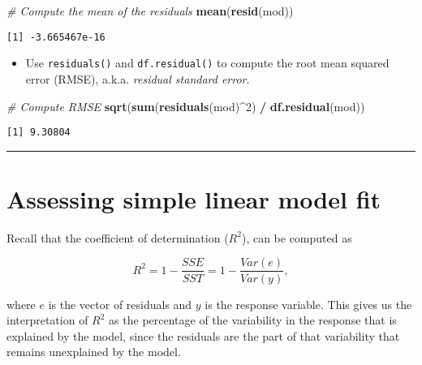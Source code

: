 \documentclass[
]{book}
\newenvironment{Shaded}{\begin{snugshade}}{\end{snugshade}}
\newcommand{\CommentTok}[1]{\textcolor[rgb]{0.56,0.35,0.01}{\textit{#1}}}
\newcommand{\DecValTok}[1]{\textcolor[rgb]{0.00,0.00,0.81}{#1}}
\newcommand{\KeywordTok}[1]{\textcolor[rgb]{0.13,0.29,0.53}{\textbf{#1}}}
\newcommand{\NormalTok}[1]{#1}
\newcommand{\OperatorTok}[1]{\textcolor[rgb]{0.81,0.36,0.00}{\textbf{#1}}}
\newcommand{\StringTok}[1]{\textcolor[rgb]{0.31,0.60,0.02}{#1}}
\providecommand{\tightlist}{%
  \setlength{\itemsep}{0pt}\setlength{\parskip}{0pt}}
\begin{document}
\begin{Shaded}
\begin{Highlighting}[]
\CommentTok{# Compute the mean of the residuals}
\KeywordTok{mean}\NormalTok{(}\KeywordTok{resid}\NormalTok{(mod))}
\end{Highlighting}
\end{Shaded}

\begin{verbatim}
[1] -3.665467e-16
\end{verbatim}

\begin{itemize}
\tightlist
\item
  Use \texttt{residuals()} and \texttt{df.residual()} to compute the root mean squared error (RMSE), a.k.a. \emph{residual standard error}.
\end{itemize}

\begin{Shaded}
\begin{Highlighting}[]
\CommentTok{# Compute RMSE}
\KeywordTok{sqrt}\NormalTok{(}\KeywordTok{sum}\NormalTok{(}\KeywordTok{residuals}\NormalTok{(mod)}\OperatorTok{^}\DecValTok{2}\NormalTok{) }\OperatorTok{/}\StringTok{ }\KeywordTok{df.residual}\NormalTok{(mod))}
\end{Highlighting}
\end{Shaded}

\begin{verbatim}
[1] 9.30804
\end{verbatim}

\begin{center}\rule{0.5\linewidth}{0.5pt}\end{center}

\hypertarget{assessing-simple-linear-model-fit}{%
\section{Assessing simple linear model fit}\label{assessing-simple-linear-model-fit}}

Recall that the coefficient of determination (\(R^2\)), can be computed as

\begin{equation}
R^2 = 1 − \frac{SSE}{SST} = 1 − \frac{Var(e)}{Var(y)},
\end{equation}

where \(e\) is the vector of residuals and \(y\) is the response variable. This gives us the interpretation of \(R^2\) as the percentage of the variability in the response that is explained by the model, since the residuals are the part of that variability that remains unexplained by the model.
\end{document}
